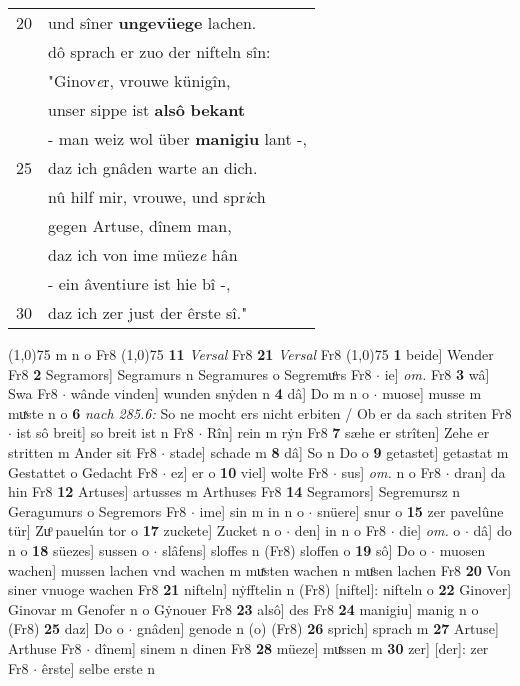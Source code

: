 \documentclass[8pt,a4paper,notitlepage]{article}
\begin{document}
\begin{table}[ht]
\begin{minipage}[t]{0.5\linewidth}
\begin{tabular}{rl}
20 & und sîner \textbf{ungevüege} lachen.\\ 
 & dô sprach er zuo der nifteln sîn:\\ 
 & "Ginov\textit{e}r, vrouwe künigîn,\\ 
 & unser sippe ist \textbf{alsô} \textbf{bekant}\\ 
 & - man weiz wol über \textbf{manigiu} lant -,\\ 
25 & daz ich gnâden warte an dich.\\ 
 & nû hilf mir, vrouwe, und spr\textit{i}ch\\ 
 & gegen Artuse, dînem man,\\ 
 & daz ich von ime müez\textit{e} hân\\ 
 & - ein âventiure ist hie bî -,\\ 
30 & daz ich zer just der êrste sî."\\ 
\end{tabular}
\scriptsize
\line(1,0){75} \newline
m n o Fr8 \newline
\line(1,0){75} \newline
\textbf{11} \textit{Versal} Fr8  \textbf{21} \textit{Versal} Fr8  \newline
\line(1,0){75} \newline
\textbf{1} beide] Wender Fr8 \textbf{2} Segramors] Segramurs n Segramures o Segremuͦrs Fr8  $\cdot$ ie] \textit{om.} Fr8 \textbf{3} wâ] Swa Fr8  $\cdot$ wânde vinden] wunden snẏden n \textbf{4} dâ] Do m n o  $\cdot$ muose] musse m muͯste n o \textbf{6} \textit{nach 285.6:} So ne mocht ers nicht erbiten / Ob er da sach striten Fr8   $\cdot$ ist sô breit] so breit ist n Fr8  $\cdot$ Rîn] rein m rẏn Fr8 \textbf{7} sæhe er strîten] Zehe er stritten m Ander sit Fr8  $\cdot$ stade] schade m \textbf{8} dâ] So n Do o \textbf{9} getastet] getastat m Gestattet o Gedacht Fr8  $\cdot$ ez] er o \textbf{10} viel] wolte Fr8  $\cdot$ sus] \textit{om.} n o Fr8  $\cdot$ dran] da hin Fr8 \textbf{12} Artuses] artusses m Arthuses Fr8 \textbf{14} Segramors] Segremursz n Geragumurs o Segremors Fr8  $\cdot$ ime] sin m in n o  $\cdot$ snüere] snur o \textbf{15} zer pavelûne tür] Zuͦ pauelún tor o \textbf{17} zuckete] Zucket n o  $\cdot$ den] in n o Fr8  $\cdot$ die] \textit{om.} o  $\cdot$ dâ] do n o \textbf{18} süezes] sussen o  $\cdot$ slâfens] sloffes n (Fr8) sloffen o \textbf{19} sô] Do o  $\cdot$ muosen wachen] mussen lachen vnd wachen m muͯsten wachen n muͦsen lachen Fr8 \textbf{20} Von siner vnuoge wachen Fr8 \textbf{21} nifteln] nẏfftelin n (Fr8) [niftel]: nifteln  o \textbf{22} Ginover] Ginovar m Genofer n o Gẏnouer Fr8 \textbf{23} alsô] des Fr8 \textbf{24} manigiu] manig n o (Fr8) \textbf{25} daz] Do o  $\cdot$ gnâden] genode n (o) (Fr8) \textbf{26} sprich] sprach m \textbf{27} Artuse] Arthuse Fr8  $\cdot$ dînem] sinem n dinen Fr8 \textbf{28} müeze] muͯssen m \textbf{30} zer] [der]: zer Fr8  $\cdot$ êrste] selbe erste n \newline
\end{minipage}
\end{table}
\end{document}
